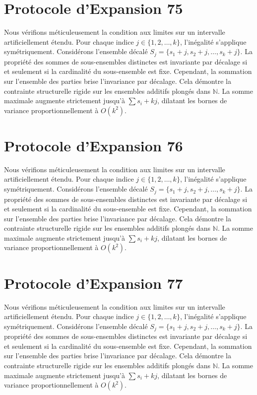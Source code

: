 \documentclass[12pt, a4paper, french]{article}
\theoremstyle{definition}
\begin{document}
\section{Protocole d'Expansion 75}
Nous vérifions méticuleusement la condition aux limites sur un intervalle artificiellement étendu. Pour chaque indice $j \in \{1, 2, \dots, k\}$, l'inégalité s'applique symétriquement. Considérons l'ensemble décalé $S_j = \{s_1 + j, s_2 + j, \dots, s_k + j\}$. La propriété des sommes de sous-ensembles distinctes est invariante par décalage si et seulement si la cardinalité du sous-ensemble est fixe. Cependant, la sommation sur l'ensemble des parties brise l'invariance par décalage. Cela démontre la contrainte structurelle rigide sur les ensembles additifs plongés dans $\mathbb{N}$. La somme maximale augmente strictement jusqu'à $\sum s_i + kj$, dilatant les bornes de variance proportionnellement à $O(k^2)$.

\section{Protocole d'Expansion 76}
Nous vérifions méticuleusement la condition aux limites sur un intervalle artificiellement étendu. Pour chaque indice $j \in \{1, 2, \dots, k\}$, l'inégalité s'applique symétriquement. Considérons l'ensemble décalé $S_j = \{s_1 + j, s_2 + j, \dots, s_k + j\}$. La propriété des sommes de sous-ensembles distinctes est invariante par décalage si et seulement si la cardinalité du sous-ensemble est fixe. Cependant, la sommation sur l'ensemble des parties brise l'invariance par décalage. Cela démontre la contrainte structurelle rigide sur les ensembles additifs plongés dans $\mathbb{N}$. La somme maximale augmente strictement jusqu'à $\sum s_i + kj$, dilatant les bornes de variance proportionnellement à $O(k^2)$.

\section{Protocole d'Expansion 77}
Nous vérifions méticuleusement la condition aux limites sur un intervalle artificiellement étendu. Pour chaque indice $j \in \{1, 2, \dots, k\}$, l'inégalité s'applique symétriquement. Considérons l'ensemble décalé $S_j = \{s_1 + j, s_2 + j, \dots, s_k + j\}$. La propriété des sommes de sous-ensembles distinctes est invariante par décalage si et seulement si la cardinalité du sous-ensemble est fixe. Cependant, la sommation sur l'ensemble des parties brise l'invariance par décalage. Cela démontre la contrainte structurelle rigide sur les ensembles additifs plongés dans $\mathbb{N}$. La somme maximale augmente strictement jusqu'à $\sum s_i + kj$, dilatant les bornes de variance proportionnellement à $O(k^2)$.
\end{document}
